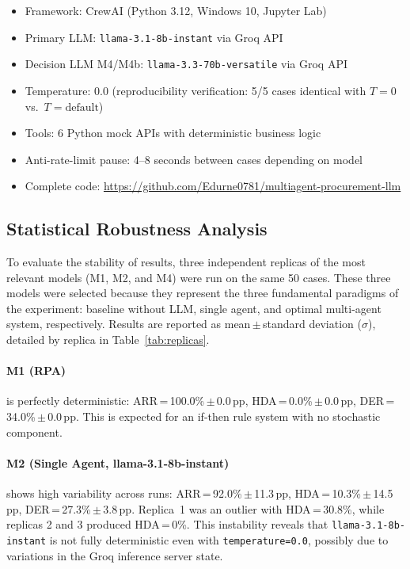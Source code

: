 \documentclass[preprint,12pt,authoryear]{elsarticle}
\begin{document}
\begin{itemize}
  \item Framework: CrewAI (Python 3.12, Windows 10, Jupyter Lab)
  \item Primary LLM: \texttt{llama-3.1-8b-instant} via Groq API
  \item Decision LLM M4/M4b: \texttt{llama-3.3-70b-versatile} via Groq API
  \item Temperature: 0.0 (reproducibility verification: 5/5 cases identical
        with $T=0$ vs.\ $T=\text{default}$)
  \item Tools: 6 Python mock APIs with deterministic business logic
  \item Anti-rate-limit pause: 4--8 seconds between cases depending on model
  \item Complete code: \url{https://github.com/Edurne0781/multiagent-procurement-llm}
\end{itemize}

\subsection{Statistical Robustness Analysis}

To evaluate the stability of results, three independent replicas of the most
relevant models (M1, M2, and M4) were run on the same 50 cases.
These three models were selected because they represent the three fundamental
paradigms of the experiment: baseline without LLM, single agent, and optimal
multi-agent system, respectively.
Results are reported as mean\,$\pm$\,standard deviation ($\sigma$), detailed by
replica in Table~\ref{tab:replicas}.

\paragraph{M1 (RPA)} is perfectly deterministic:
ARR\,=\,100.0\%\,$\pm$\,0.0\,pp, HDA\,=\,0.0\%\,$\pm$\,0.0\,pp,
DER\,=\,34.0\%\,$\pm$\,0.0\,pp.
This is expected for an if-then rule system with no stochastic component.

\paragraph{M2 (Single Agent, llama-3.1-8b-instant)} shows high variability
across runs: ARR\,=\,92.0\%\,$\pm$\,11.3\,pp,
HDA\,=\,10.3\%\,$\pm$\,14.5\,pp, DER\,=\,27.3\%\,$\pm$\,3.8\,pp.
Replica~1 was an outlier with HDA\,=\,30.8\%, while replicas 2 and 3 produced
HDA\,=\,0\%.
This instability reveals that \texttt{llama-3.1-8b-instant} is not fully
deterministic even with \texttt{temperature=0.0}, possibly due to variations in
the Groq inference server state.
\end{document}
